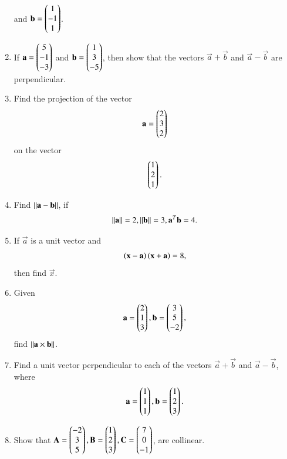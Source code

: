 \begin{enumerate}[label=\arabic*.,ref=\thesubsection.\theenumi]
  and 
$\mathbf{b}=\begin{pmatrix}1\\-1\\1\end{pmatrix}$.
\item If 
$\mathbf{a}=\begin{pmatrix}5\\-1\\-3\end{pmatrix}$
  and 
$\mathbf{b}=\begin{pmatrix}1\\3\\-5\end{pmatrix}$,
%
then show that the vectors $\vec{a}+\vec{b}$ and $\vec{a}-\vec{b}$ are perpendicular.
%
\item Find the projection of the vector 
\begin{align}
\mathbf{a} = \begin{pmatrix}2\\3\\2\end{pmatrix}
\end{align}
on the vector
\begin{align}
\begin{pmatrix}1\\2\\1\end{pmatrix}.
\end{align}
%
\item Find $\left\lVert\mathbf{a}-\mathbf{b}\right\rVert$, if 
\begin{align}
\left\lVert\mathbf{a}\right\rVert = 2, 
\left\lVert\mathbf{b}\right\rVert = 3,
\mathbf{a}^T\mathbf{b} = 4.
\end{align}
%
\item If $\vec{a}$ is a unit vector and 
%
\begin{align}
\left(\mathbf{x}-\mathbf{a}\right)\left(\mathbf{x}+\mathbf{a}\right) = 8, 
\end{align}
%
then find $\vec{x}$.
%
\item Given
\begin{align}
\mathbf{a}=\begin{pmatrix}2\\1\\3\end{pmatrix},
\mathbf{b}=\begin{pmatrix}3\\5\\-2\end{pmatrix},
\end{align}
find $\left\lVert\mathbf{a} \times \mathbf{b}\right\rVert$.
%
\item Find a unit vector perpendicular to each of the vectors
$\vec{a}+\vec{b}$ and $\vec{a}-\vec{b}$, where 
\begin{align}
\mathbf{a}=\begin{pmatrix}1\\1\\1\end{pmatrix},
\mathbf{b}=\begin{pmatrix}1\\2\\3\end{pmatrix}.
\end{align}
%
\item Show that 
$\mathbf{A}=\begin{pmatrix}-2\\3\\5\end{pmatrix}, \mathbf{B}=\begin{pmatrix}1\\2\\3\end{pmatrix}, \mathbf{C}=\begin{pmatrix}7\\0\\-1\end{pmatrix}$, are collinear.

\end{enumerate}
